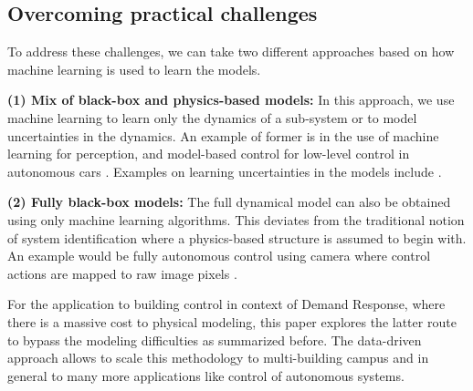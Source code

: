 
\subsection{Overcoming practical challenges}
To address these challenges, we can take two different approaches based on how machine learning is used to learn the models.

\noindent \textbf{(1) Mix of black-box and physics-based models:} In this approach, we use machine learning to learn only the dynamics of a sub-system or to model uncertainties in the dynamics. An example of former is in the use of machine learning for perception, and model-based control for low-level control in autonomous cars \cite{Urmson2008}. Examples on learning uncertainties in the models include \cite{Berkenkamp2015,Desaraju2016}.

\noindent \textbf{(2) Fully black-box models:} The full dynamical model can also be obtained using only machine learning algorithms. This deviates from the traditional notion of system identification where a physics-based structure is assumed to begin with. An example would be fully autonomous control using camera where control actions are mapped to raw image pixels \cite{Bojarski2016}. 

For the application to building control in context of Demand Response, where there is a massive cost to physical modeling, this paper explores the latter route to bypass the modeling difficulties as summarized before. The data-driven approach allows to scale this methodology to multi-building campus and in general to many more applications like control of autonomous systems.


